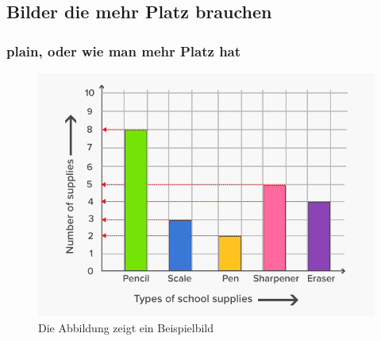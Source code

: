 \documentclass[compress,aspectratio=169]{beamer} %
\begin{document}
	\subsection{Bilder die mehr Platz brauchen} 
	\begin{frame}[plain]
		\frametitle{plain, oder wie man mehr Platz hat}
		\begin{figure}
			\includegraphics[scale=0.3]{PIC1} 
			\caption{Die Abbildung zeigt ein Beispielbild}
		\end{figure}
	\end{frame}
	
	
\end{document}
